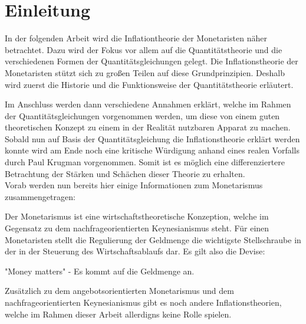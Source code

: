 \documentclass[
	12pt,
	BCOR=5mm,
	DIV=12,
	headinclude=on,
	footinclude=off,
	parskip=half,
	bibliography=totoc,
	listof=entryprefix,
	toc=listof,
	numbers=noenddot,
]{scrreprt}
\begin{document}


\tableofcontents

\listoffigures


\chapter{Einleitung}

\ihead{\chaptername~\thechapter}

In der folgenden Arbeit wird die Inflationtheorie der Monetaristen näher betrachtet. 
Dazu wird der Fokus vor allem auf die Quantitätstheorie und die verschiedenen Formen der Quantitätsgleichungen gelegt. Die Inflationstheorie der Monetaristen stützt sich zu großen Teilen auf diese Grundprinzipien. Deshalb wird zuerst die Historie und die Funktionsweise der Quantitätstheorie erläutert. 

Im Anschluss werden dann verschiedene Annahmen erklärt, welche im Rahmen der Quantitätsgleichungen vorgenommen werden, um diese von einem guten theoretischen Konzept zu einem in der Realität nutzbaren Apparat zu machen. Sobald nun auf Basis der Quantitätsgleichung die Inflationstheorie erklärt werden konnte wird am Ende noch eine kritische Würdigung anhand eines realen Vorfalls durch Paul Krugman vorgenommen. Somit ist es möglich eine differenziertere Betrachtung der Stärken und Schächen dieser Theorie zu erhalten. \\
Vorab werden nun bereits hier einige Informationen zum Monetarismus zusammengetragen:

Der Monetarismus ist eine wirtschaftstheoretische Konzeption, welche im Gegensatz zu dem nachfrageorientierten Keynesianismus steht. Für einen Monetaristen stellt die Regulierung der Geldmenge die wichtigste Stellschraube in der in der Steuerung des Wirtschaftsablaufs dar. Es gilt also die Devise:

\begin{center}
    "Money matters" - Es kommt auf die Geldmenge an.
\end{center}

Zusätzlich zu dem angebotsorientierten Monetarismus und dem nachfrageorientierten Keynesianismus gibt es noch andere Inflationstheorien, welche im Rahmen dieser Arbeit allerdigns keine Rolle spielen.



\printbibliography[title=Literaturverzeichnis]
\end{document}
